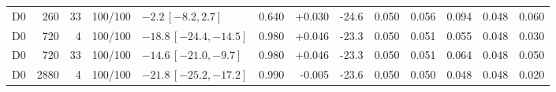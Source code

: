 \begin{longtable}{crrcp{33mm}rrrrrrrr}
D0 & 260 & 33 & 100/100 & \(-2.2\,[-8.2,2.7]\) & 0.640 & +0.030 & -24.6 & 0.050 & 0.056 & 0.094 & 0.048 & 0.060\\
D0 & 720 & 4 & 100/100 & \(-18.8\,[-24.4,-14.5]\) & 0.980 & +0.046 & -23.3 & 0.050 & 0.051 & 0.055 & 0.048 & 0.030\\
D0 & 720 & 33 & 100/100 & \(-14.6\,[-21.0,-9.7]\) & 0.980 & +0.046 & -23.3 & 0.050 & 0.051 & 0.064 & 0.048 & 0.050\\
D0 & 2880 & 4 & 100/100 & \(-21.8\,[-25.2,-17.2]\) & 0.990 & -0.005 & -23.6 & 0.050 & 0.050 & 0.048 & 0.048 & 0.020\\

\end{longtable}
